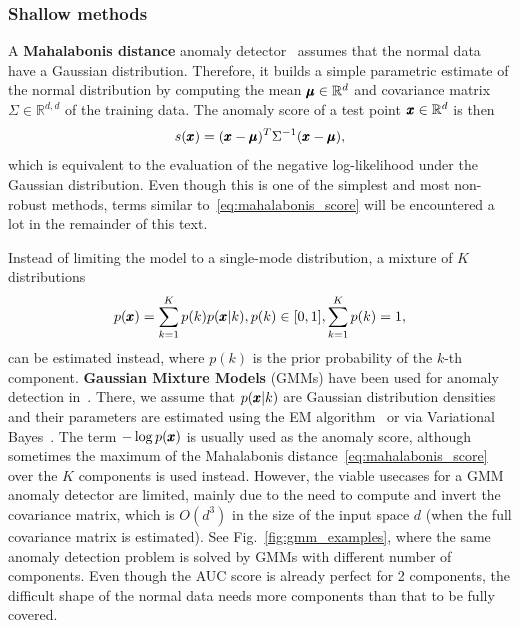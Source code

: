 \subsubsection{Shallow methods}
A \textbf{Mahalabonis distance} anomaly detector~\cite{laurikkala2000informal} assumes that the normal data have a Gaussian distribution. Therefore, it builds a simple parametric estimate of the normal distribution by computing the mean $\pmb{{\mu}} \in \mathbb{R}^d$ and covariance matrix $\Sigma \in \mathbb{R}^{d,d}$ of the training data. The anomaly score of a test point $\pmb{{x}} \in \mathbb{R}^d$ is then
\begin{equation} \label{eq:mahalabonis_score}
	s(\pmb{{x}}) =  (\pmb{{x}} - \pmb{{\mu}}) ^T \Sigma ^{-1} (\pmb{{x}}-\pmb{{\mu}}),
\end{equation}
which is equivalent to the evaluation of the negative log-likelihood under the Gaussian distribution. Even though this is one of the simplest and most non-robust methods, terms similar to~\eqref{eq:mahalabonis_score} will be encountered a lot in the remainder of this text.

Instead of limiting the model to a single-mode distribution, a mixture of $K$ distributions 
\begin{equation} \label{eq:mixture}
	p(\pmb{{x}}) = \sum_{k=1}^K p(k) p(\pmb{{x}}|k), p(k) \in [0,1], \sum_{k=1}^K p(k) = 1,
\end{equation}
can be estimated instead, where $p(k)$ is the prior probability of the $k$-th component. \textbf{Gaussian Mixture Models} (GMMs) have been used for anomaly detection in~\cite{roberts1994probabilistic,mahadevan2010anomaly}. There, we assume that $p(\pmb{{x}}|k)$ are Gaussian distribution densities and their parameters are estimated using the EM algorithm~\cite{dempster1977maximum} or via Variational Bayes~\cite{bishop2006pattern}. The term $-\log p(\pmb{{x}})$ is usually used as the anomaly score, although sometimes the maximum of the Mahalabonis distance~\eqref{eq:mahalabonis_score} over the $K$ components is used instead. However, the viable usecases for a GMM anomaly detector are limited, mainly due to the need to compute and invert the covariance matrix, which is $O(d^3)$ in the size of the input space $d$ (when the full covariance matrix is estimated). See Fig.~\ref{fig:gmm_examples}, where the same anomaly detection problem is solved by GMMs with different number of components. Even though the AUC score is already perfect for 2 components, the difficult shape of the normal data needs more components than that to be fully covered.

